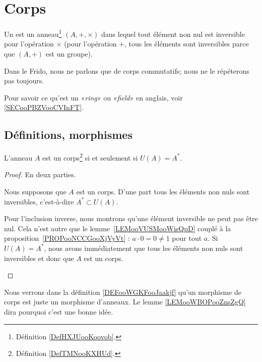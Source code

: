 

\section{Corps}


\begin{definition}  \label{DefTMNooKXHUd}
	Un  est un anneau\footnote{Définition \ref{DefHXJUooKoovob}.} \( (A, +,\times)\) dans lequel tout élément non nul est inversible pour l'opération \( \times\) (pour l'opération \( +\), tous les éléments sont inversibles parce que \( (A,+)\) est un groupe).
\end{definition}

\begin{normaltext}
	Dans le Frido, nous ne parlons que de corps commutatifs; nous ne le répéterons pas toujours.
\end{normaltext}

\begin{normaltext}
	Pour savoir ce qu'est un «\emph{ring}» ou «\emph{field}» en anglais, voir \ref{SECooPBZVooCVInFT}.
\end{normaltext}

\subsection{Définitions, morphismes}

\begin{proposition}		\label{PROPooFQZYooWedmwl}
	L'anneau \( A\) est un corps\footnote{Définition \ref{DefTMNooKXHUd}.} si et seulement si \( U(A) = A^* \).
\end{proposition}

\begin{proof}
	En deux parties.
	\begin{subproof}
		Nous supposons que \( A\) est un corps. D'une part tous les éléments non nuls sont inversibles, c'est-à-dire \( A^*\subset U(A)\).

		Pour l'inclusion inverse, nous montrons qu'une élément inversible ne peut pas être nul. Cela n'est autre que le lemme~\ref{LEMooVUSMooWisQpD} couplé à la proposition~\ref{PROPooNCCGooXjVyVt} : \( a\cdot 0=0\neq 1\) pour tout \( a\).
		Si \( U(A)=A^*\), nous avons immédiatement que tous les éléments non nuls sont inversibles et donc que \( A\) est un corps.
	\end{subproof}
\end{proof}

\begin{normaltext}
	Nous verrons dans la définition \ref{DEFooWGKFooJaakjf} qu'un morphisme de corps est juste un morphisme d'anneaux. Le lemme \ref{LEMooWBOPooZnsZgQ} dira pourquoi c'est une bonne idée.
\end{normaltext}
